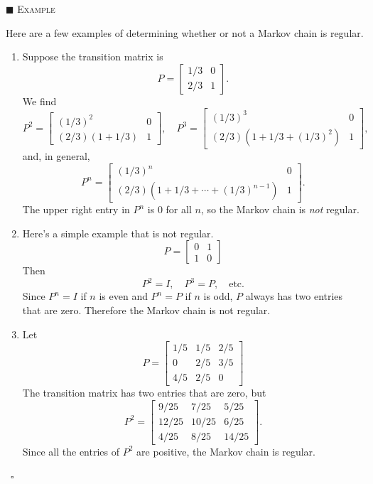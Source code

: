 \documentclass[reqno]{immbook}
\numberwithin{equation}{chapter}
\numberwithin{question}{section}
\numberwithin{theorem}{chapter}
\numberwithin{figure}{chapter}
\theoremstyle{definition}
\newenvironment{xexample}%
{%

\medskip\noindent\addtocounter{example}{1}$\blacksquare$ \textsc{Example \theexample}\hspace*{1em}%
}%
{%
~\hfill$\square$

\medskip
}
\begin{document}
\begin{xexample}
Here are a few examples of determining whether or not a
Markov chain is regular.
\begin{enumerate}
\item Suppose the transition matrix is
\begin{equation}
  P = \begin{bmatrix} 1/3 & 0 \\ 2/3 & 1 \end{bmatrix}.
\end{equation}
We find
\begin{equation}
 P^2 = \begin{bmatrix} (1/3)^2 & 0 \\ (2/3)(1+1/3) & 1 \end{bmatrix},
 \quad
 P^3 = \begin{bmatrix} (1/3)^3 & 0 \\ (2/3)(1+1/3+(1/3)^2) & 1 \end{bmatrix},
\end{equation}
and, in general,
\begin{equation}
 P^n = \begin{bmatrix} (1/3)^n & 0 \\ (2/3)(1+1/3+\cdots+(1/3)^{n-1}) & 1 \end{bmatrix}.
\end{equation}
The upper right entry in $P^n$ is $0$ for all $n$, so the Markov chain
is \emph{not} regular.
\item Here's a simple example that is not regular.
\begin{equation}
   P = \begin{bmatrix} 0 & 1 \\ 1 & 0 \end{bmatrix}
\end{equation}
Then
\begin{equation}
   P^2 = I, \quad P^3 = P, \quad \textrm{etc.}
\end{equation}
Since $P^n=I$ if $n$ is even and $P^n=P$ if $n$ is odd, $P$
always has two entries that are zero.  Therefore the Markov
chain is not regular.
\item
Let
\begin{equation}
  P = \begin{bmatrix}
           1/5 & 1/5 & 2/5 \\
	   0   & 2/5 & 3/5 \\
	   4/5 & 2/5 & 0
      \end{bmatrix}
\end{equation}
The transition matrix has two entries that are zero, but
\begin{equation}
  P^2 = \begin{bmatrix}
           9/25 & 7/25 & 5/25 \\
	   12/25 & 10/25 & 6/25 \\
	   4/25 & 8/25 & 14/25
        \end{bmatrix}.
\end{equation}
Since all the entries of $P^2$ are positive, the Markov chain
is regular.
\end{enumerate}
\end{xexample}
%
%
%
\end{document}

